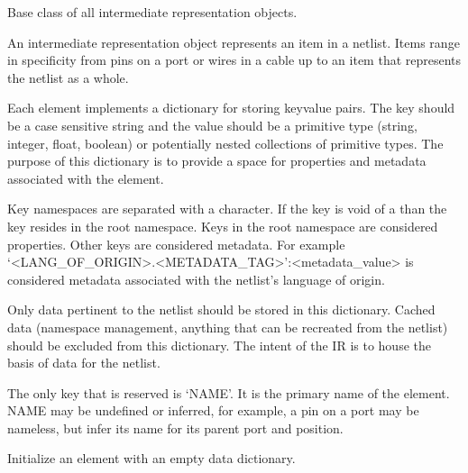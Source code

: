 \documentclass[letterpaper,10pt,english,openany,oneside]{sphinxmanual}
\begin{document}
\begin{fulllineitems}
\label{\detokenize{reference/classes/generated/spydrnet.ir.FirstClassElement:spydrnet.ir.FirstClassElement}}
Base class of all intermediate representation objects.

An intermediate representation object represents an item in a netlist. Items range in specificity from pins on a
port or wires in a cable up to an item that represents the netlist as a whole.

Each element implements a dictionary for storing key\sphinxhyphen{}value pairs. The key should be a case sensitive string and the
value should be a primitive type (string, integer, float, boolean) or potentially nested collections of primitive
types. The purpose of this dictionary is to provide a space for properties and metadata associated with the element.

Key namespaces are separated with a  character. If the key is void of a  than the key resides in the
root namespace. Keys in the root namespace are considered properties. Other keys are considered metadata. For
example ‘\textless{}LANG\_OF\_ORIGIN\textgreater{}.\textless{}METADATA\_TAG\textgreater{}’:\textless{}metadata\_value\textgreater{} is considered metadata associated with the netlist’s
language of origin.

Only data pertinent to the netlist should be stored in this dictionary. Cached data (namespace management, anything
that can be recreated from the netlist) should be excluded from this dictionary. The intent of the IR is to house
the basis of data for the netlist.

The only key that is reserved is ‘NAME’. It is the primary name of the element. NAME may be undefined or inferred,
for example, a pin on a port may be nameless, but infer its name for its parent port and position.

\begin{fulllineitems}
\label{\detokenize{reference/classes/generated/spydrnet.ir.FirstClassElement:spydrnet.ir.FirstClassElement.__init__}}
Initialize an element with an empty data dictionary.


\end{fulllineitems}
\end{fulllineitems}
\end{document}
